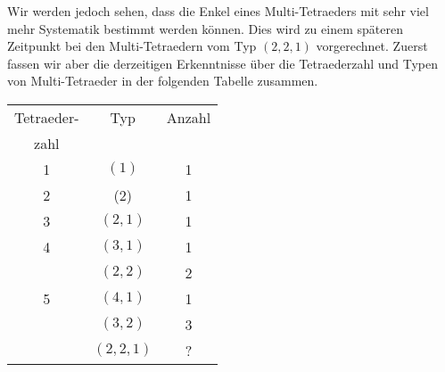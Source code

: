 \documentclass[12pt,titlepage,twoside,cleardoublepage]{article}
\theoremstyle{nummermitklammern}
\numberwithin{equation}{section}
\begin{document}
 Wir werden jedoch sehen, dass die Enkel eines Multi-Tetraeders mit sehr viel mehr Systematik bestimmt werden können. Dies wird zu einem späteren Zeitpunkt bei den Multi-Tetraedern vom Typ $(2,2,1)$ vorgerechnet. Zuerst fassen wir aber die derzeitigen Erkenntnisse über die Tetraederzahl und Typen von Multi-Tetraeder in der folgenden Tabelle zusammen. 
\begin{center}
\begin{tabular}{|c|c|c|}
\hline
Tetraeder- & Typ & Anzahl\\
zahl& &\\
\hline
1 &$(1)$ &1 \\
\hline
2 &(2) &1\\
\hline
3 &$(2,1)$ &1\\
\hline
4 &$(3,1)$ & 1 \\
 & $(2,2)$& 2\\
\hline
5 & $(4,1)$& 1\\
 &$(3,2)$ & 3\\
 & $(2,2,1)$& ?\\
\hline
\end{tabular}
\end{center}
\end{document}
